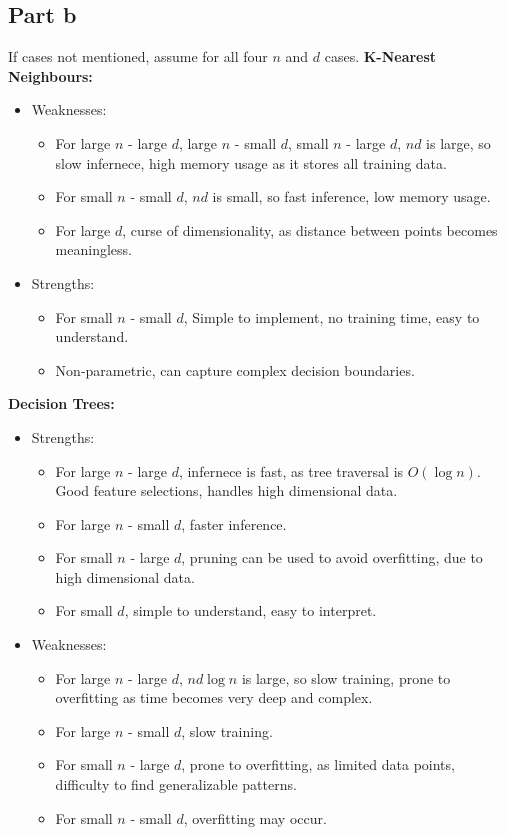 \documentclass[12pt]{article}
\begin{document}
\subsection*{Part b}
If cases not mentioned, assume for all four $n$ and $d$ cases.
\textbf{K-Nearest Neighbours:}
\begin{itemize}
    \item Weaknesses: 
           \begin{itemize}
                \item For large $n$ - large $d$, large $n$ - small $d$, small $n$ - large $d$, $nd$ is large, 
                        so slow infernece, high memory usage as it stores all training data.
                \item For small $n$ - small $d$, $nd$ is small, so fast inference, low memory usage.
                \item For large $d$, curse of dimensionality, as distance between points becomes meaningless.
            \end{itemize}
    \item Strengths:
            \begin{itemize}
                \item For small $n$ - small $d$, Simple to implement, no training time, easy to understand.
                \item Non-parametric, can capture complex decision boundaries.
            \end{itemize}
\end{itemize}

\textbf{Decision Trees:}
\begin{itemize}
    \item Strengths: 
            \begin{itemize}
                \item For large $n$ - large $d$, infernece is fast, as tree traversal is $O(\log n)$. Good feature selections, handles high dimensional data.
                \item For large $n$ - small $d$, faster inference.
                \item For small $n$ - large $d$, pruning can be used to avoid overfitting, due to high dimensional data.
                \item For small $d$, simple to understand, easy to interpret.
            \end{itemize}
    \item Weaknesses:
            \begin{itemize}
                \item For large $n$ - large $d$, $nd\log n$ is large, so slow training, prone to overfitting as time becomes very deep and complex.
                \item For large $n$ - small $d$, slow training.
                \item For small $n$ - large $d$, prone to overfitting, as limited data points, difficulty to find generalizable patterns.
                \item For small $n$ - small $d$, overfitting may occur.
            \end{itemize}
\end{itemize}
\end{document}
